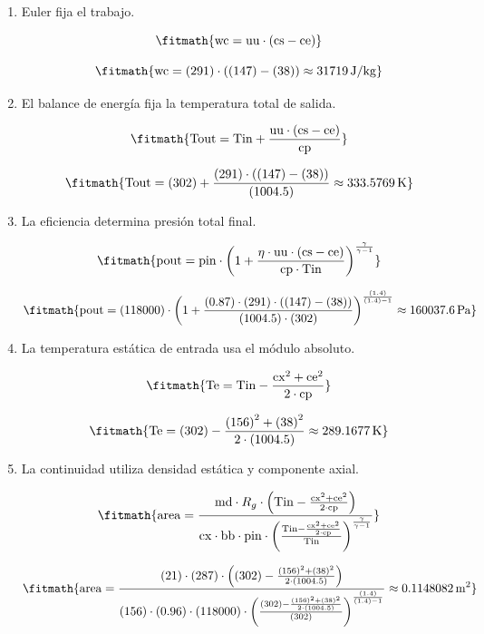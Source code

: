 \begin{enumerate}

\item Euler fija el trabajo.

\[\fitmath{\mathrm{wc}=\mathrm{uu}\cdot \left(\mathrm{cs}-\mathrm{ce}\right)}\]

\[\fitmath{\mathrm{wc}=(291)\cdot \left((147)-(38)\right)\approx 31719\,\mathrm{J/kg}}\]

\item El balance de energía fija la temperatura total de salida.

\[\fitmath{\mathrm{Tout}=\mathrm{Tin}+\frac{\mathrm{uu}\cdot \left(\mathrm{cs}-\mathrm{ce}\right)}{\mathrm{cp}}}\]

\[\fitmath{\mathrm{Tout}=(302)+\frac{(291)\cdot \left((147)-(38)\right)}{(1004.5)}\approx 333.5769\,\mathrm{K}}\]

\item La eficiencia determina presión total final.

\[\fitmath{\mathrm{pout}=\mathrm{pin}\cdot {\left(1+\frac{\eta\cdot \mathrm{uu}\cdot \left(\mathrm{cs}-\mathrm{ce}\right)}{\mathrm{cp}\cdot \mathrm{Tin}}\right)}^{\frac{\gamma}{\gamma-1}}}\]

\[\fitmath{\mathrm{pout}=(118000)\cdot {\left(1+\frac{(0.87)\cdot (291)\cdot \left((147)-(38)\right)}{(1004.5)\cdot (302)}\right)}^{\frac{(1.4)}{(1.4)-1}}\approx 160037.6\,\mathrm{Pa}}\]

\item La temperatura estática de entrada usa el módulo absoluto.

\[\fitmath{\mathrm{Te}=\mathrm{Tin}-\frac{{\mathrm{cx}}^{2}+{\mathrm{ce}}^{2}}{2\cdot \mathrm{cp}}}\]

\[\fitmath{\mathrm{Te}=(302)-\frac{{(156)}^{2}+{(38)}^{2}}{2\cdot (1004.5)}\approx 289.1677\,\mathrm{K}}\]

\item La continuidad utiliza densidad estática y componente axial.

\[\fitmath{\mathrm{area}=\frac{\mathrm{md}\cdot R_g\cdot \left(\mathrm{Tin}-\frac{{\mathrm{cx}}^{2}+{\mathrm{ce}}^{2}}{2\cdot \mathrm{cp}}\right)}{\mathrm{cx}\cdot \mathrm{bb}\cdot \mathrm{pin}\cdot {\left(\frac{\mathrm{Tin}-\frac{{\mathrm{cx}}^{2}+{\mathrm{ce}}^{2}}{2\cdot \mathrm{cp}}}{\mathrm{Tin}}\right)}^{\frac{\gamma}{\gamma-1}}}}\]

\[\fitmath{\mathrm{area}=\frac{(21)\cdot (287)\cdot \left((302)-\frac{{(156)}^{2}+{(38)}^{2}}{2\cdot (1004.5)}\right)}{(156)\cdot (0.96)\cdot (118000)\cdot {\left(\frac{(302)-\frac{{(156)}^{2}+{(38)}^{2}}{2\cdot (1004.5)}}{(302)}\right)}^{\frac{(1.4)}{(1.4)-1}}}\approx 0.1148082\,\mathrm{m^{2}}}\]

\end{enumerate}
